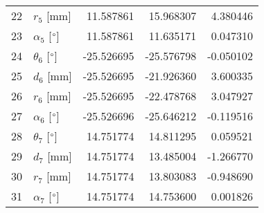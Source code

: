 \documentclass{standalone}%
\begin{document}
\begin{tabular}{llrrr}
22 &              $r_{5}$ [mm] &  11.587861 &  15.968307 &   4.380446 \\
23 &  $\alpha_{5}$ [$\degree$] &  11.587861 &  11.635171 &   0.047310 \\
24 &  $\theta_{6}$ [$\degree$] & -25.526695 & -25.576798 &  -0.050102 \\
25 &              $d_{6}$ [mm] & -25.526695 & -21.926360 &   3.600335 \\
26 &              $r_{6}$ [mm] & -25.526695 & -22.478768 &   3.047927 \\
27 &  $\alpha_{6}$ [$\degree$] & -25.526696 & -25.646212 &  -0.119516 \\
28 &  $\theta_{7}$ [$\degree$] &  14.751774 &  14.811295 &   0.059521 \\
29 &              $d_{7}$ [mm] &  14.751774 &  13.485004 &  -1.266770 \\
30 &              $r_{7}$ [mm] &  14.751774 &  13.803083 &  -0.948690 \\
31 &  $\alpha_{7}$ [$\degree$] &  14.751774 &  14.753600 &   0.001826 \\
\bottomrule
\end{tabular}
%
\end{document}
